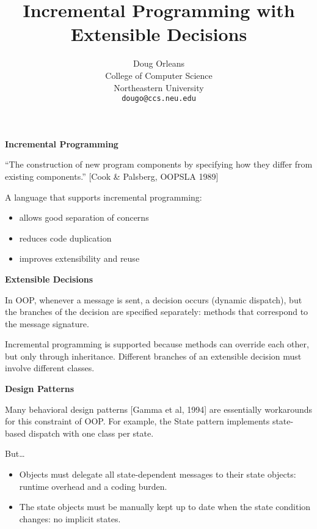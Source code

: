 \documentclass[landscape]{slides}
\title{Incremental Programming with \\ Extensible Decisions}
\author{Doug Orleans \\
College of Computer Science\\
Northeastern University \\
\texttt{dougo@ccs.neu.edu}
}
\begin{document}
\maketitle


\newcommand{\defn}[1]{\textbf{#1}}
\newcommand{\code}[1]{\texttt{#1}}
\newcommand{\slidetitle}[1]{\begin{center}\textbf{#1}\end{center}}

\begin{slide}
  \slidetitle{Incremental Programming}

  ``The construction of new program components by specifying how they
  differ from existing components.'' [Cook \& Palsberg, OOPSLA 1989]

  A language that supports incremental programming:
  \begin{itemize}
    \item allows good separation of concerns
    \item reduces code duplication
    \item improves extensibility and reuse
  \end{itemize}
\end{slide}

\begin{slide}
  \slidetitle{Extensible Decisions}

  In OOP, whenever a message is sent, a decision occurs (dynamic
  dispatch), but the branches of the decision are specified
  separately: methods that correspond to the message signature.

  Incremental programming is supported because methods can override
  each other, but only through inheritance.  Different branches of an
  extensible decision must involve different classes.
\end{slide}

\begin{slide}
  \slidetitle{Design Patterns}

  Many behavioral design patterns [Gamma et al, 1994] are essentially
  workarounds for this constraint of OOP.  For example, the State
  pattern implements state-based dispatch with one class per state.

  But\ldots
  \begin{itemize}
    \item Objects must delegate all state-dependent messages to their
          state objects: runtime overhead and a coding burden.
    \item The state objects must be manually kept up to date when the
          state condition changes: no implicit states.
  \end{itemize}
\end{slide}
\end{document}
